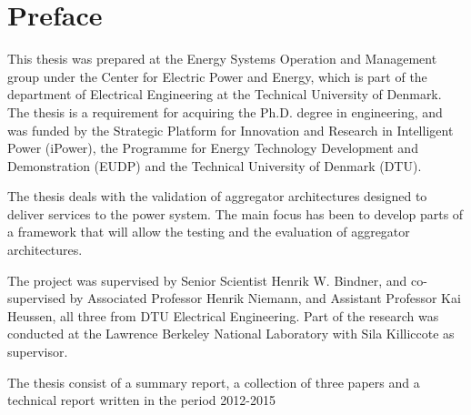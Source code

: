 \chapter{Preface}
This thesis was prepared at the Energy Systems Operation and Management group under the Center for Electric Power and Energy, which is part of the department of Electrical Engineering at the Technical University of Denmark. The thesis is a requirement for acquiring the Ph.D. degree in engineering, and was funded by the Strategic Platform for Innovation and Research in Intelligent Power (iPower), the Programme  for Energy Technology Development and Demonstration (EUDP) and the Technical University of Denmark (DTU).

The thesis deals with the validation of aggregator architectures designed to deliver services to the power system. The main focus has been to develop parts of a framework that will allow the testing and the evaluation of aggregator architectures.

The project was supervised by Senior Scientist Henrik W. Bindner, and co-supervised by Associated Professor Henrik Niemann, and Assistant Professor Kai Heussen, all three from DTU Electrical Engineering. Part of the research was conducted at the Lawrence Berkeley National Laboratory with Sila Killiccote as supervisor.

The thesis consist of a summary report, a collection of three papers and a technical report written in the period 2012-2015
\vfill

{
\centering
\begin{flushright}
    \thesisauthor{}
\end{flushright}
}
